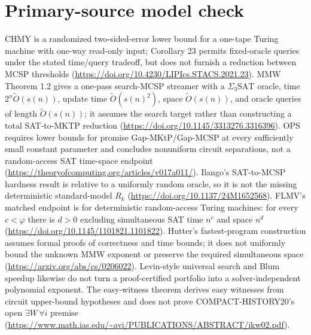 \documentclass[11pt]{article}
\begin{document}
\section*{Primary-source model check}
CHMY is a randomized two-sided-error lower bound for a one-tape Turing
machine with one-way read-only input; Corollary 23 permits fixed-oracle queries
under the stated time/query tradeoff, but does not furnish a reduction between
MCSP thresholds
(\url{https://doi.org/10.4230/LIPIcs.STACS.2021.23}).
MMW Theorem 1.2 gives a one-pass search-MCSP streamer with a
$\Sigma_3\mathrm{SAT}$ oracle, time $2^n\widetilde O(s(n))$, update time
$\widetilde O(s(n)^2)$, space $\widetilde O(s(n))$, and oracle queries of
length $\widetilde O(s(n))$; it assumes the search target rather than
constructing a total SAT-to-MKTP reduction
(\url{https://doi.org/10.1145/3313276.3316396}).
OPS requires lower bounds for promise Gap-MKtP/Gap-MCSP at every sufficiently
small constant parameter and concludes nonuniform circuit separations, not a
random-access SAT time-space endpoint
(\url{https://theoryofcomputing.org/articles/v017a011/}).
Ilango's SAT-to-MCSP hardness result is relative to a uniformly random oracle,
so it is not the missing deterministic standard-model $R_k$
(\url{https://doi.org/10.1137/24M1652568}).
FLMV's matched endpoint is for deterministic random-access Turing machines:
for every $c<\varphi$ there is $d>0$ excluding simultaneous SAT time $n^c$
and space $n^d$
(\url{https://doi.org/10.1145/1101821.1101822}).
Hutter's fastest-program construction assumes formal proofs of correctness and
time bounds; it does not uniformly bound the unknown MMW exponent or preserve
the required simultaneous space
(\url{https://arxiv.org/abs/cs/0206022}).
Levin-style universal search and Blum speedup likewise do not turn a
proof-certified portfolio into a solver-independent polynomial exponent.
The easy-witness theorem derives easy witnesses from circuit upper-bound
hypotheses and does not prove COMPACT-HISTORY20's open
$\exists W\,\forall i$ premise
(\url{https://www.math.ias.edu/~avi/PUBLICATIONS/ABSTRACT/ikw02.pdf}).
\end{document}
